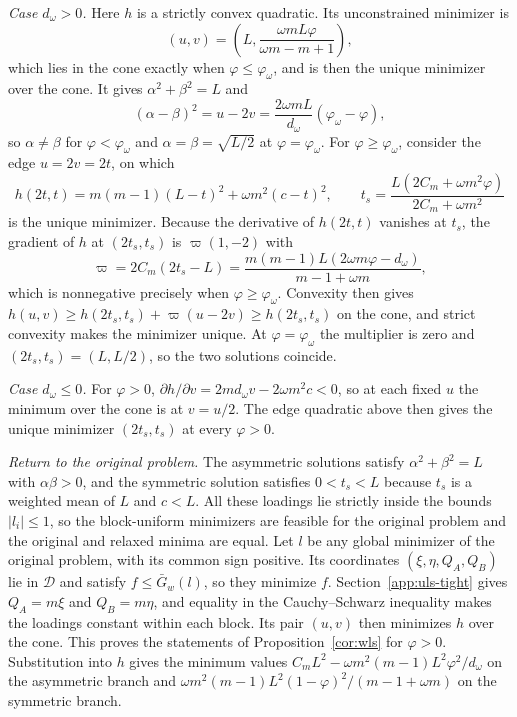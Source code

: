 \emph{Case $d_\omega>0$.} Here $h$ is a strictly convex quadratic. Its unconstrained minimizer is
\[
(u,v)=\left(L,\frac{\omega mL\varphi}{\omega m-m+1}\right),
\]
which lies in the cone exactly when $\varphi\le\varphi_\omega$, and is then the unique minimizer over the cone. It gives $\alpha^2+\beta^2=L$ and
\[
(\alpha-\beta)^2=u-2v=\frac{2\omega mL}{d_\omega}(\varphi_\omega-\varphi),
\]
so $\alpha\ne\beta$ for $\varphi<\varphi_\omega$ and $\alpha=\beta=\sqrt{L/2}$ at $\varphi=\varphi_\omega$. For $\varphi\ge\varphi_\omega$, consider the edge $u=2v=2t$, on which
\[
h(2t,t)=m(m-1)(L-t)^2+\omega m^2(c-t)^2,
\qquad
t_s=\frac{L(2C_m+\omega m^2\varphi)}{2C_m+\omega m^2}
\]
is the unique minimizer. Because the derivative of $h(2t,t)$ vanishes at $t_s$, the gradient of $h$ at $(2t_s,t_s)$ is $\varpi(1,-2)$ with
\[
\varpi=2C_m(2t_s-L)=\frac{m(m-1)L(2\omega m\varphi-d_\omega)}{m-1+\omega m},
\]
which is nonnegative precisely when $\varphi\ge\varphi_\omega$. Convexity then gives $h(u,v)\ge h(2t_s,t_s)+\varpi(u-2v)\ge h(2t_s,t_s)$ on the cone, and strict convexity makes the minimizer unique. At $\varphi=\varphi_\omega$ the multiplier is zero and $(2t_s,t_s)=(L,L/2)$, so the two solutions coincide.

\emph{Case $d_\omega\le0$.} For $\varphi>0$, $\partial h/\partial v=2md_\omega v-2\omega m^2c<0$, so at each fixed $u$ the minimum over the cone is at $v=u/2$. The edge quadratic above then gives the unique minimizer $(2t_s,t_s)$ at every $\varphi>0$.

\emph{Return to the original problem.} The asymmetric solutions satisfy $\alpha^2+\beta^2=L$ with $\alpha\beta>0$, and the symmetric solution satisfies $0<t_s<L$ because $t_s$ is a weighted mean of $L$ and $c<L$. All these loadings lie strictly inside the bounds $|l_i|\le1$, so the block-uniform minimizers are feasible for the original problem and the original and relaxed minima are equal. Let $l$ be any global minimizer of the original problem, with its common sign positive. Its coordinates $(\xi,\eta,Q_A,Q_B)$ lie in $\mathcal D$ and satisfy $f\le\bar G_w(l)$, so they minimize $f$. Section~\ref{app:uls-tight} gives $Q_A=m\xi$ and $Q_B=m\eta$, and equality in the Cauchy--Schwarz inequality makes the loadings constant within each block. Its pair $(u,v)$ then minimizes $h$ over the cone. This proves the statements of Proposition~\ref{cor:wls} for $\varphi>0$. Substitution into $h$ gives the minimum values $C_mL^2-\omega m^2(m-1)L^2\varphi^2/d_\omega$ on the asymmetric branch and $\omega m^2(m-1)L^2(1-\varphi)^2/(m-1+\omega m)$ on the symmetric branch.

